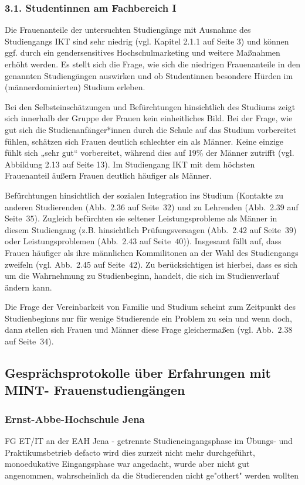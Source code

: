\documentclass[a4paper, 12 pt]{IEEEtran}
\begin{document}
\subsubsection*{3.1. Studentinnen am Fachbereich I}
Die Frauenanteile der untersuchten Studiengänge mit Ausnahme des Studiengangs IKT sind sehr niedrig (vgl. Kapitel 2.1.1 auf Seite $3$) und können ggf. durch ein gendersensitives Hochschulmarketing und weitere Maßnahmen erhöht werden. Es stellt sich die Frage, wie sich die niedrigen Frauenanteile in den genannten Studiengängen auswirken und ob Studentinnen besondere Hürden
im (männerdominierten) Studium erleben.

Bei den Selbsteinschätzungen und Befürchtungen hinsichtlich des Studiums zeigt sich innerhalb der Gruppe der Frauen kein einheitliches Bild. Bei der Frage, wie gut sich die Studienanfänger*innen durch die Schule auf das Studium vorbereitet fühlen, schätzen sich Frauen deutlich schlechter ein als Männer. Keine einzige fühlt sich „sehr gut“ vorbereitet, während dies auf 19\% der Männer zutrifft (vgl. Abbildung 2.13 auf Seite 13). Im Studiengang IKT mit dem höchsten Frauenanteil äußern Frauen deutlich häufiger als Männer.

Befürchtungen hinsichtlich der sozialen Integration ins Studium (Kontakte zu anderen Studierenden (Abb.~2.36 auf Seite~$32$) und zu Lehrenden (Abb.~2.39 auf Seite~$35$). Zugleich befürchten sie seltener Leistungsprobleme als Männer in diesem Studiengang (z.B. hinsichtlich Prüfungsversagen (Abb.~2.42 auf Seite~$39$) oder Leistungsproblemen (Abb.~2.43 auf Seite~$40$)). Insgesamt fällt auf, dass Frauen häufiger als ihre männlichen Kommilitonen an der Wahl des Studiengangs zweifeln (vgl. Abb.~2.45 auf Seite~$42$). Zu berücksichtigen ist hierbei, dass es sich um die Wahrnehmung zu Studienbeginn, handelt, die sich im Studienverlauf ändern kann.

Die Frage der Vereinbarkeit von Familie und Studium scheint zum Zeitpunkt des Studienbeginns nur für wenige Studierende ein Problem zu sein und wenn doch, dann stellen sich Frauen und Männer diese Frage gleichermaßen (vgl. Abb.~$2.38$ auf Seite~$34$).

\subsection{Gesprächsprotokolle über Erfahrungen mit MINT- Frauenstudiengängen}\label{sec:Gespraechsprotokolle}

\subsubsection{Ernst-Abbe-Hochschule Jena}
FG ET/IT an der EAH Jena - getrennte Studieneingangsphase im Übungs- und Praktikumsbetrieb defacto wird dies zurzeit nicht mehr durchgeführt, monoedukative Eingangsphase war angedacht, wurde aber nicht gut angenommen, wahrscheinlich da die Studierenden nicht ge"othert" werden wollten
\end{document}
